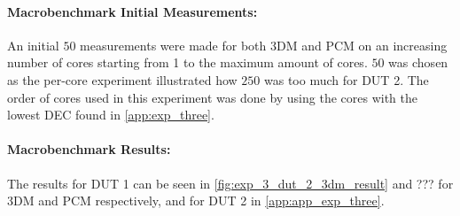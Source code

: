 



\paragraph*{Macrobenchmark Initial Measurements:} An initial $50$ measurements were made for both 3DM and PCM on an increasing number of cores starting from 1 to the maximum amount of cores. $50$ was chosen as the per-core experiment illustrated how $250$ was too much for DUT 2. The order of cores used in this experiment was done by using the cores with the lowest DEC found in \cref{app:exp_three}.



\paragraph*{Macrobenchmark Results:} The results for DUT 1 can be seen in \cref{fig:exp_3_dut_2_3dm_result} and ??? for 3DM and PCM respectively, and for DUT 2 in \cref{app:app_exp_three}.
